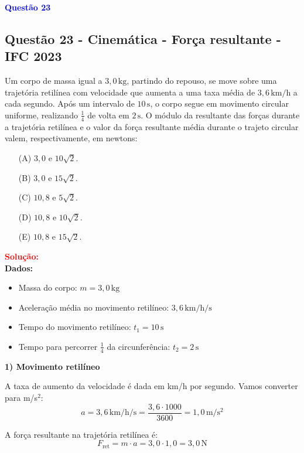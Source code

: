 \begin{flushleft}
\textbf{\textcolor{blue}{\Large Quest\~ao 23}}\\
\noindent
\subsection{Quest\~ao 23 - Cinemática - For\c{c}a resultante - IFC 2023}
Um corpo de massa igual a $3{,}0\,\mathrm{kg}$, partindo do repouso, 
se move sobre uma trajetória retilínea com velocidade que aumenta a 
uma taxa média de $3{,}6\,\mathrm{km/h}$ a cada segundo. Após um intervalo 
de $10\,\mathrm{s}$, o corpo segue em movimento circular uniforme, realizando 
$\frac{1}{4}$ de volta em $2\,\mathrm{s}$. O módulo da resultante das forças 
durante a trajetória retilínea e o valor da força resultante média durante o 
trajeto circular valem, respectivamente, em newtons:

\begin{itemize}
\item[(A)] $3{,}0$ e $10\sqrt{2}$.
\item[(B)] $3{,}0$ e $15\sqrt{2}$.
\item[(C)] $10{,}8$ e $5\sqrt{2}$.
\item[(D)] $10{,}8$ e $10\sqrt{2}$.
\item[(E)] $10{,}8$ e $15\sqrt{2}$.
\end{itemize}

\vspace{0.5cm}

\textcolor{red}{\textbf{Solução:}}\\

\textbf{Dados:}
\begin{itemize}
    \item Massa do corpo: $m = 3,0\,\mathrm{kg}$
    \item Aceleração média no movimento retilíneo: $3,6\,\mathrm{km/h/s}$
    \item Tempo do movimento retilíneo: $t_1 = 10\,\mathrm{s}$
    \item Tempo para percorrer $\frac{1}{4}$ da circunferência: $t_2 = 2\,\mathrm{s}$
\end{itemize}

\textbf{1) Movimento retilíneo}

A taxa de aumento da velocidade é dada em km/h por segundo. Vamos converter para m/s$^2$:
\[
a = 3{,}6\,\mathrm{km/h/s} = \frac{3{,}6 \cdot 1000}{3600} = 1{,}0\,\mathrm{m/s^2}
\]

A força resultante na trajetória retilínea é:
\[
F_{\text{ret}} = m \cdot a = 3{,}0 \cdot 1{,}0 = 3{,}0\,\mathrm{N}
\]


\end{flushleft}

